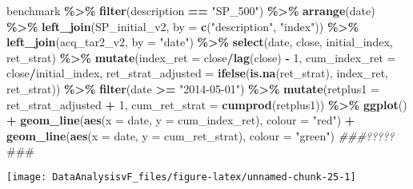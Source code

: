 \documentclass[
]{article}
\newenvironment{Shaded}{\begin{snugshade}}{\end{snugshade}}
\newcommand{\AlertTok}[1]{\textcolor[rgb]{0.94,0.16,0.16}{#1}}
\newcommand{\CommentTok}[1]{\textcolor[rgb]{0.56,0.35,0.01}{\textit{#1}}}
\newcommand{\DataTypeTok}[1]{\textcolor[rgb]{0.13,0.29,0.53}{#1}}
\newcommand{\DecValTok}[1]{\textcolor[rgb]{0.00,0.00,0.81}{#1}}
\newcommand{\KeywordTok}[1]{\textcolor[rgb]{0.13,0.29,0.53}{\textbf{#1}}}
\newcommand{\NormalTok}[1]{#1}
\newcommand{\OperatorTok}[1]{\textcolor[rgb]{0.81,0.36,0.00}{\textbf{#1}}}
\newcommand{\StringTok}[1]{\textcolor[rgb]{0.31,0.60,0.02}{#1}}
\begin{document}
\begin{Shaded}
\begin{Highlighting}[]
\NormalTok{benchmark }\OperatorTok{\%\textgreater{}\%}
\StringTok{  }\KeywordTok{filter}\NormalTok{(description }\OperatorTok{==}\StringTok{ "SP\_500"}\NormalTok{) }\OperatorTok{\%\textgreater{}\%}
\StringTok{  }\KeywordTok{arrange}\NormalTok{(date) }\OperatorTok{\%\textgreater{}\%}
\StringTok{  }\KeywordTok{left\_join}\NormalTok{(SP\_initial\_v2, }\DataTypeTok{by =} \KeywordTok{c}\NormalTok{(}\StringTok{"description"}\NormalTok{, }\StringTok{"index"}\NormalTok{)) }\OperatorTok{\%\textgreater{}\%}
\StringTok{  }\KeywordTok{left\_join}\NormalTok{(acq\_tar2\_v2, }\DataTypeTok{by =} \StringTok{"date"}\NormalTok{) }\OperatorTok{\%\textgreater{}\%}
\StringTok{  }\KeywordTok{select}\NormalTok{(date, close, initial\_index, ret\_strat) }\OperatorTok{\%\textgreater{}\%}
\StringTok{  }\KeywordTok{mutate}\NormalTok{(}\DataTypeTok{index\_ret =}\NormalTok{ close}\OperatorTok{/}\KeywordTok{lag}\NormalTok{(close) }\OperatorTok{{-}}\StringTok{ }\DecValTok{1}\NormalTok{,}
         \DataTypeTok{cum\_index\_ret =}\NormalTok{ close}\OperatorTok{/}\NormalTok{initial\_index,}
         \DataTypeTok{ret\_strat\_adjusted =} \KeywordTok{ifelse}\NormalTok{(}\KeywordTok{is.na}\NormalTok{(ret\_strat), index\_ret, ret\_strat)) }\OperatorTok{\%\textgreater{}\%}
\StringTok{  }\KeywordTok{filter}\NormalTok{(date }\OperatorTok{\textgreater{}=}\StringTok{ "2014{-}05{-}01"}\NormalTok{) }\OperatorTok{\%\textgreater{}\%}
\StringTok{  }\KeywordTok{mutate}\NormalTok{(}\DataTypeTok{retplus1 =}\NormalTok{ ret\_strat\_adjusted }\OperatorTok{+}\StringTok{ }\DecValTok{1}\NormalTok{,}
    \DataTypeTok{cum\_ret\_strat =} \KeywordTok{cumprod}\NormalTok{(retplus1)) }\OperatorTok{\%\textgreater{}\%}
\StringTok{  }\KeywordTok{ggplot}\NormalTok{() }\OperatorTok{+}
\StringTok{  }\KeywordTok{geom\_line}\NormalTok{(}\KeywordTok{aes}\NormalTok{(}\DataTypeTok{x =}\NormalTok{ date, }\DataTypeTok{y =}\NormalTok{ cum\_index\_ret), }\DataTypeTok{colour =} \StringTok{"red"}\NormalTok{) }\OperatorTok{+}
\StringTok{  }\KeywordTok{geom\_line}\NormalTok{(}\KeywordTok{aes}\NormalTok{(}\DataTypeTok{x =}\NormalTok{ date, }\DataTypeTok{y =}\NormalTok{ cum\_ret\_strat), }\DataTypeTok{colour =} \StringTok{"green"}\NormalTok{) }\CommentTok{\#\#\#?????}\AlertTok{\#\#\#}\CommentTok{ }
\end{Highlighting}
\end{Shaded}

\begin{center}\texttt{[image: DataAnalysisvF\_files/figure-latex/unnamed-chunk-25-1]} \end{center}
\end{document}

